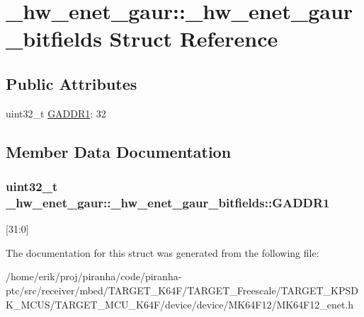 \hypertarget{struct__hw__enet__gaur_1_1__hw__enet__gaur__bitfields}{}\section{\+\_\+hw\+\_\+enet\+\_\+gaur\+:\+:\+\_\+hw\+\_\+enet\+\_\+gaur\+\_\+bitfields Struct Reference}
\label{struct__hw__enet__gaur_1_1__hw__enet__gaur__bitfields}
\subsection*{Public Attributes}
\begin{DoxyCompactItemize}
\item 
uint32\+\_\+t \hyperlink{struct__hw__enet__gaur_1_1__hw__enet__gaur__bitfields_ac3a9ad934ba0aea1b177015aab7b4607}{G\+A\+D\+D\+R1}\+: 32
\end{DoxyCompactItemize}


\subsection{Member Data Documentation}
\subsubsection[{\texorpdfstring{G\+A\+D\+D\+R1}{GADDR1}}]{\setlength{\rightskip}{0pt plus 5cm}uint32\+\_\+t \+\_\+hw\+\_\+enet\+\_\+gaur\+::\+\_\+hw\+\_\+enet\+\_\+gaur\+\_\+bitfields\+::\+G\+A\+D\+D\+R1}\hypertarget{struct__hw__enet__gaur_1_1__hw__enet__gaur__bitfields_ac3a9ad934ba0aea1b177015aab7b4607}{}\label{struct__hw__enet__gaur_1_1__hw__enet__gaur__bitfields_ac3a9ad934ba0aea1b177015aab7b4607}
\mbox{[}31\+:0\mbox{]} 

The documentation for this struct was generated from the following file\+:\begin{DoxyCompactItemize}
\item 
/home/erik/proj/piranha/code/piranha-\/ptc/src/receiver/mbed/\+T\+A\+R\+G\+E\+T\+\_\+\+K64\+F/\+T\+A\+R\+G\+E\+T\+\_\+\+Freescale/\+T\+A\+R\+G\+E\+T\+\_\+\+K\+P\+S\+D\+K\+\_\+\+M\+C\+U\+S/\+T\+A\+R\+G\+E\+T\+\_\+\+M\+C\+U\+\_\+\+K64\+F/device/device/\+M\+K64\+F12/M\+K64\+F12\+\_\+enet.\+h\end{DoxyCompactItemize}
